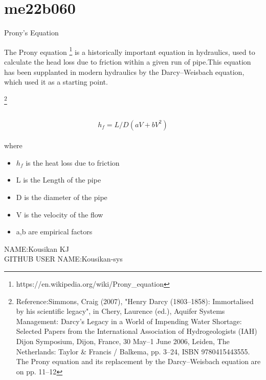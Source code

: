 \section{me22b060}
\begin{center}
\huge{Prony's Equation}  
\end{center}

The Prony equation \footnote{https://en.wikipedia.org/wiki/Prony_equation}
is a historically important equation in hydraulics, used to calculate the head loss due to friction within a given run of pipe.This equation has been supplanted in modern hydraulics by the Darcy–Weisbach equation, which used it as a starting point.

\footnote{Reference:Simmons, Craig (2007), "Henry Darcy (1803–1858): Immortalised by his scientific legacy", in Chery, Laurence (ed.), Aquifer Systems Management: Darcy's Legacy in a World of Impending Water Shortage: Selected Papers from the International Association of Hydrogeologists (IAH) Dijon Symposium, Dijon, France, 30 May–1 June 2006, Leiden, The Netherlands: Taylor & Francis / Balkema, pp. 3–24, ISBN 9780415443555. The Prony equation and its replacement by the Darcy–Weisbach equation are on pp. 11–12}

\\

    

  {\huge \[h_f = L/D(aV+bV^2)\]} 
\\
where
\\
\begin{itemize}
    \item $h_f$ is the heat loss due to friction
    \item L is the Length of the pipe
    \item D is the diameter of the pipe
    \item V is the velocity of the flow
    \item a,b are empirical factors
\end{itemize}    


\begin{flushleft}
NAME:Kousikan KJ\\
GITHUB USER NAME:Kousikan-sys
\end{flushleft}
